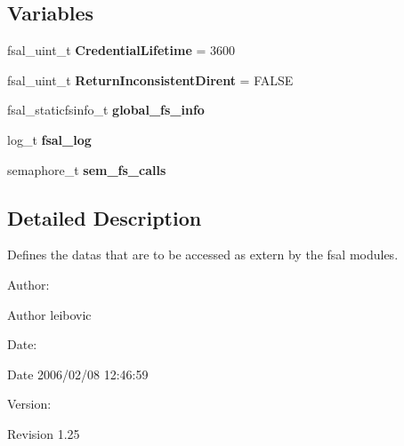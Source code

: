 \subsection*{Variables}
\begin{CompactItemize}
\item 
fsal\_\-uint\_\-t \textbf{CredentialLifetime} = 3600\label{fsal__internal_8c_f3cb7380eea92f3a001fbcbe517e8e1c}

\item 
fsal\_\-uint\_\-t \textbf{ReturnInconsistentDirent} = FALSE\label{fsal__internal_8c_c3af4311d2c1075371c73ef185dcdda3}

\item 
fsal\_\-staticfsinfo\_\-t \textbf{global\_\-fs\_\-info}\label{fsal__internal_8c_2c43caebcfbbfc95b5d4917b99d70fa1}

\item 
log\_\-t \textbf{fsal\_\-log}\label{fsal__internal_8c_40064e582b2112b48cbb377868b840b2}

\item 
semaphore\_\-t \textbf{sem\_\-fs\_\-calls}\label{fsal__internal_8c_d249483e6d6223333f220241279dc57d}

\end{CompactItemize}


\subsection{Detailed Description}
Defines the datas that are to be accessed as extern by the fsal modules. 

\begin{Desc}
\item[Author:]\end{Desc}
\begin{Desc}
\item[Author]leibovic \end{Desc}
\begin{Desc}
\item[Date:]\end{Desc}
\begin{Desc}
\item[Date]2006/02/08 12:46:59 \end{Desc}
\begin{Desc}
\item[Version:]\end{Desc}
\begin{Desc}
\item[Revision]1.25 \end{Desc}


